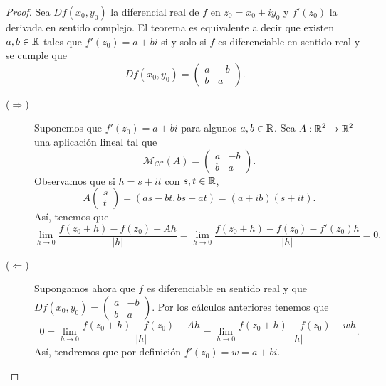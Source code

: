 \begin{proof}
Sea $\displaystyle Df\left(x_{0}, y_{0}\right) $ la diferencial real de $\displaystyle f $ en $\displaystyle z_{0} = x_{0} + iy_{0} $ y $\displaystyle f'\left(z_{0}\right) $ la derivada en sentido complejo. El teorema es equivalente a decir que existen $\displaystyle a,b \in \mathbb{R} $ tales que $\displaystyle f'\left(z_{0}\right)=a + bi $ si y solo si $\displaystyle f $ es diferenciable en sentido real y se cumple que 
\[Df\left(x_{0}, y_{0}\right)=\begin{pmatrix} a & -b \\ b & a \end{pmatrix} .\]
\begin{description}
\item[($\displaystyle \Rightarrow $)] Suponemos que $\displaystyle f'\left(z_{0}\right)=a+bi $ para algunos $\displaystyle a,b\in \mathbb{R} $. Sea $\displaystyle A : \mathbb{R}^{2} \to \mathbb{R}^{2} $ una aplicación lineal tal que 
	\[\mathcal{M}_{\mathcal{C}\mathcal{C}}\left(A\right)=\begin{pmatrix} a & - b \\ b & a \end{pmatrix} .\]
Observamos que si $\displaystyle h = s + it $ con $\displaystyle s,t \in \mathbb{R} $,
\[A\begin{pmatrix} s \\ t \end{pmatrix}=\left(as-bt, bs + at\right)=\left(a + ib\right)\left(s + it\right) .\]
Así, tenemos que 
\[\lim_{h \to 0}\frac{f\left(z_{0} +h\right)-f\left(z_{0}\right)-Ah}{ \left|h\right|}=\lim_{h \to 0}\frac{f\left(z_{0} + h\right)-f\left(z_{0}\right)-f'\left(z_{0}\right)h}{ \left|h\right|} = 0 .\]
\item[($\displaystyle \Leftarrow $)] Supongamos ahora que $\displaystyle f $ es diferenciable en sentido real y que $\displaystyle Df\left(x_{0}, y_{0}\right)=\begin{pmatrix} a & - b\\ b & a \end{pmatrix} $. Por los cálculos anteriores tenemos que 
	\[0 = \lim_{h \to 0}\frac{f\left(z_{0} +h\right)-f\left(z_{0}\right)-Ah}{ \left|h\right|}=\lim_{h \to 0}\frac{f\left(z_{0} + h\right)-f\left(z_{0}\right)-wh}{ \left|h\right|} .\]
	Así, tendremos que por definición $\displaystyle f'\left(z_{0}\right)=w = a + bi $. 
\end{description}
\end{proof}
